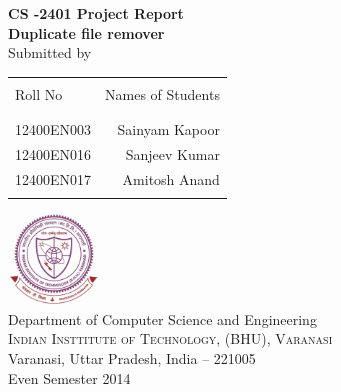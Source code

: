 \begin{titlepage}

\begin{center}

\textup{\small {\bf CS -2401  Project Report}}\\[0.2in]

\Large \textbf {Duplicate file remover}\\[0.5in]

\normalsize Submitted by \\
\begin{table}[h]
\centering
\begin{tabular}{lr}\hline \\
Roll No & Names of Students \\ \\ \hline
\\
12400EN003 & Sainyam Kapoor \\
12400EN016 & Sanjeev Kumar \\ 
12400EN017 & Amitosh Anand \\ \\ \hline 
\end{tabular}
\end{table}

\vspace{.1in}

\vfill

\includegraphics[width=0.18\textwidth]{./IITBHU_Logo_Matlab}\\[0.1in]
\Large{Department of Computer Science and Engineering}\\
\normalsize
\textsc{Indian Insttitute of Technology, (BHU), Varanasi}\\
Varanasi, Uttar Pradesh, India -- 221005\\
\vspace{0.2cm}
Even Semester 2014

\end{center}

\end{titlepage}
